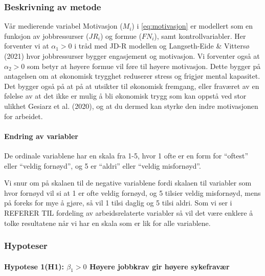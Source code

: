 \documentclass[
  12pt,
  a4paper,
  DIV=11,
  numbers=noendperiod]{scrartcl}
\let\oldparagraph\paragraph
\renewcommand{\paragraph}[1]{\oldparagraph{#1}\mbox{}}
\begin{document}
\subsubsection{Beskrivning av metode}\label{beskrivning-av-metode}

Vår medierende variabel Motivasjon (\(M_i\)) i \autoref{eq:motivasjon}
er modellert som en funksjon av jobbressurser (\(JR_i\)) og formue
(\(FN_i\)), samt kontrollvariabler. Her forventer vi at \(\alpha_1 > 0\)
i tråd med JD-R modellen og Langseth-Eide \& Vittersø (2021) hvor
jobbressurser bygger engasjement og motivasjon. Vi forventer også at
\(\alpha_2 > 0\) som betyr at høyere formue vil føre til høyere
motivasjon. Dette bygger på antagelsen om at økonomisk trygghet
reduserer stress og frigjør mental kapasitet. Det bygger også på at på
at utsikter til økonomisk fremgang, eller fraværet av en følelse av at
det ikke er mulig å bli økonomisk trygg som kan oppstå ved stor ulikhet
Gesiarz et al. (2020), og at du dermed kan styrke den indre motivasjonen
for arbeidet.

\paragraph{Endring av variabler}\label{endring-av-variabler}

De ordinale variablene har en skala fra 1-5, hvor 1 ofte er en form for
``oftest'' eller ``veldig fornøyd'', og 5 er ``aldri'' eller ``veldig
misfornøyd''.

Vi snur om på skalaen til de negative variablene fordi skalaen til
variabler som hvor fornøyd vil si at 1 er ofte veldig fornøyd, og 5
tilsier veldig misfornøyd, mens på foreks for mye å gjøre, så vil 1
tilsi daglig og 5 tilsi aldri. Som vi ser i REFERER TIL fordeling av
arbeidsrelaterte variabler så vil det være enklere å tolke resultatene
når vi har en skala som er lik for alle variablene.

\subsubsection{Hypoteser}\label{sec-hypot}

\paragraph{\texorpdfstring{Hypotese 1(H1): \(\beta_1 > 0\) Høyere
jobbkrav gir høyere
sykefravær}{Hypotese 1(H1): \textbackslash beta\_1 \textgreater{} 0 Høyere jobbkrav gir høyere sykefravær}}\label{hypotese-1h1-beta_1-0-huxf8yere-jobbkrav-gir-huxf8yere-sykefravuxe6r}
\end{document}
